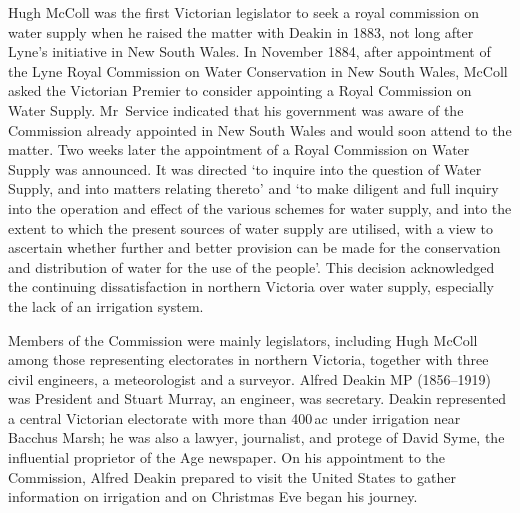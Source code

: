 Hugh McColl was the first Victorian legislator to seek a royal
commission on water supply when he raised the matter with Deakin in
1883, not long after Lyne's initiative in New South Wales. In November
1884, after appointment of the Lyne Royal Commission on Water
Conservation in New South Wales, McColl asked the Victorian Premier to
consider appointing a Royal Commission on Water Supply. Mr~Service
indicated that his government was aware of the Commission already
appointed in New South Wales and would soon attend to the matter.  Two
weeks later the appointment of a Royal Commission on Water Supply was
announced. It was directed `to inquire into the question of Water
Supply, and into matters relating thereto' and `to make diligent and
full inquiry into the operation and effect of the various schemes for
water supply, and into the extent to which the present sources of
water supply are utilised, with a view to ascertain whether further
and better provision can be made for the conservation and distribution
of water for the use of the people'. This decision acknowledged the
continuing dissatisfaction in northern Victoria over water supply,
especially the lack of an irrigation system.

Members of the Commission were mainly legislators, including Hugh
McColl among those representing electorates in northern Victoria,
together with three civil engineers, a meteorologist and a surveyor.
Alfred Deakin MP (1856--1919) was President and Stuart Murray, an
engineer, was secretary.  Deakin represented a central Victorian
electorate with more than 400\,ac under irrigation near Bacchus Marsh;
he was also a lawyer, journalist, and protege of David Syme, the
influential proprietor of the Age newspaper.  On his appointment to
the Commission, Alfred Deakin prepared to visit the United States to
gather information on irrigation and on Christmas Eve began his
journey.

